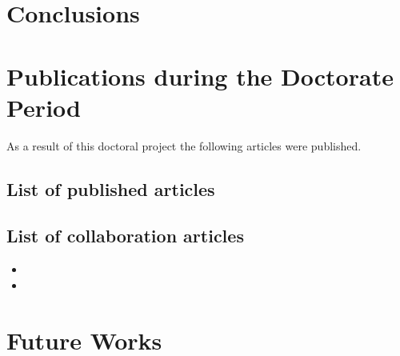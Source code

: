 \section{Conclusions}

\section{Publications during the Doctorate Period}

As a result of this doctoral project the following articles were published.
\subsection{List of published articles}

\subsection{List of collaboration articles}
\begin{itemize}
	\item {} 
    \item {}     
\end{itemize}

\section{Future Works}
%
